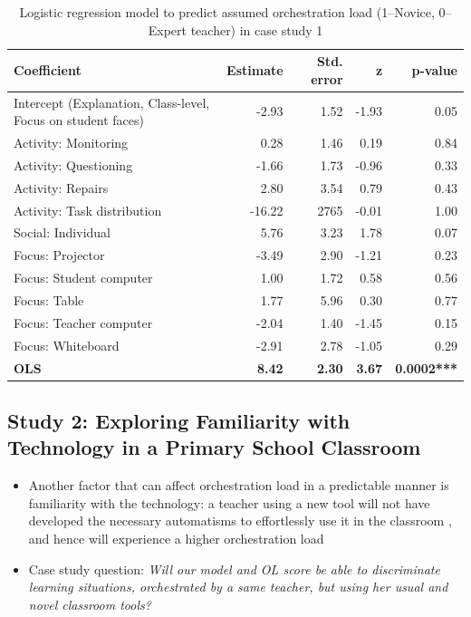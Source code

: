 \documentclass[10pt,journal,compsoc]{IEEEtran}
\begin{document}
\begin{table}[!t]
\caption{Logistic regression model to predict assumed orchestration load (1--Novice, 0--Expert teacher) in case study 1}
\label{tab:case1results}
\centering
\begin{tabular}{|p{2.8cm}||r|r|r|r|}
\hline
Coefficient & Estimate & Std. error & z & p-value\\
\hline
\hline
Intercept (Explanation, Class-level, Focus on student faces) & -2.93 & 1.52 & -1.93 & 0.05 \\
Activity: Monitoring & 0.28 & 1.46 & 0.19 & 0.84 \\
Activity: Questioning & -1.66 & 1.73 & -0.96 & 0.33 \\
Activity: Repairs & 2.80 & 3.54 & 0.79 & 0.43 \\
Activity: Task distribution & -16.22 & 2765 & -0.01 & 1.00 \\
Social: Individual & 5.76 & 3.23 & 1.78 & 0.07 \\
Focus: Projector & -3.49 & 2.90 & -1.21 & 0.23 \\
Focus: Student computer & 1.00 & 1.72 & 0.58 & 0.56 \\
Focus: Table & 1.77 & 5.96 & 0.30 & 0.77 \\
Focus: Teacher computer & -2.04 & 1.40 & -1.45 & 0.15 \\
Focus: Whiteboard & -2.91 & 2.78 & -1.05 & 0.29 \\
\textbf{OLS} & \textbf{8.42} & \textbf{2.30} & \textbf{3.67} & \textbf{0.0002***} \\
\hline
\end{tabular}
\end{table}


\subsection{Study 2: Exploring Familiarity with Technology in a Primary School Classroom}

\begin{itemize}
\item Another factor that can affect orchestration load in a predictable manner is familiarity with the technology: a teacher using a new tool will not have developed the necessary automatisms to effortlessly use it in the classroom \cite{feldon2007cognitive}, and hence will experience a higher orchestration load
\item Case study question: \textit{Will our model and OL score be able to discriminate learning situations, orchestrated by a same teacher, but using her usual and novel classroom tools?}
\end{itemize}
\end{document}
